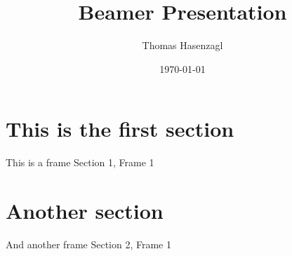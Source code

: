 \documentclass{beamer}
\author{Thomas Hasenzagl}
\title{Beamer Presentation}
\date{\today}
\begin{document}
\maketitle 

\section{This is the first section}

\begin{frame}{This is a frame}
    Section 1, Frame 1
\end{frame}

\section{Another section}

\begin{frame}{And another frame}
    Section 2, Frame 1
\end{frame}
\end{document}
